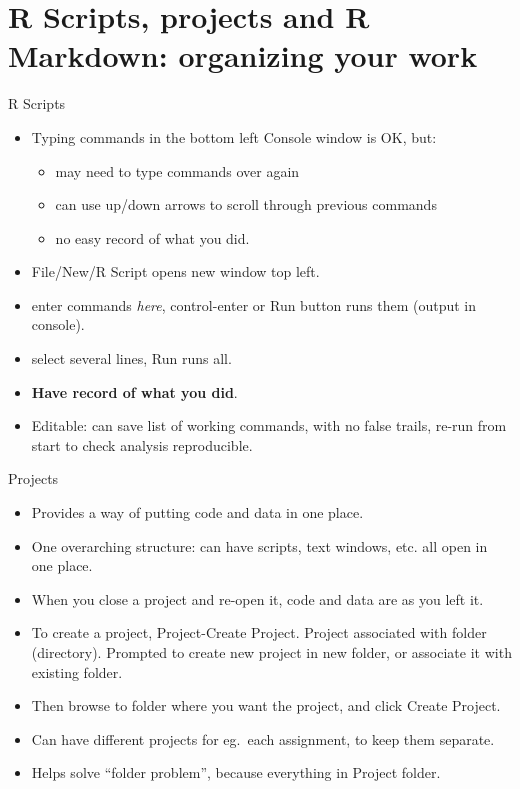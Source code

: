 \section{R Scripts, projects and R Markdown: organizing your work}
\frame{\sectionpage}

\begin{frame}[frame]{R Scripts}
  
  \begin{itemize}
  \item Typing commands in the bottom left Console window is OK, but:
    \begin{itemize}
    \item may need to type commands over again
    \item can use up/down arrows to scroll through previous commands
    \item no easy record of what you did.
    \end{itemize}

  \item File/New/R Script opens new window top left.
  \item enter commands \emph{here}, control-enter or Run button runs
    them (output in console).
  \item select several lines, Run runs all.
  \item \textbf{Have record of what you did}.
  \item Editable: can save list of working commands, with no false
    trails, re-run from start to check analysis reproducible.
  \end{itemize}
  
\end{frame}

\begin{frame}[fragile]{Projects}
  
  \begin{itemize}
  \item Provides a way of putting code and data in one place.
  \item One overarching structure: can have scripts, text windows,
    etc. all open in one place.
  \item When you close a project and re-open it, code and data are as
    you left it.
  \item To create a project, Project-Create Project. Project
    associated with folder (directory). Prompted to create new project
    in new folder, or associate it with existing folder.
  \item Then browse to folder where you want the project, and click
    Create Project.
  \item Can have different projects for eg.\ each assignment, to keep
    them separate.
  \item Helps solve ``folder problem'', because everything in Project folder.
  \end{itemize}
  
\end{frame}

